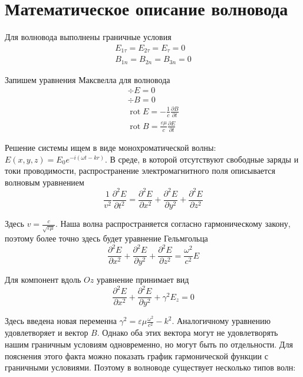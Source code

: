 \documentclass[a4paper, 14pt]{article}
\newcommand{\rot}{\mathop{\mathrm{rot}} \nolimits}
\begin{document}
    \section*{Математическое описание волновода} 
    
    Для волновода выполнены граничные условия
    \begin{gather*}
        E_{1\tau} = E_{2\tau} = E_\tau = 0 \\
        B_{1n} = B_{2n} = B_{3n} = 0
    \end{gather*}
    
    Запишем уравнения Максвелла для волновода
    \begin{gather*}
        \div E = 0 \\
        \div B = 0 \\
        \rot E = - \frac{1}{c} \frac{\partial B}{\partial t} \\
        \rot B = \frac{\varepsilon \mu}{c} \frac{\partial E}{\partial t}
    \end{gather*}
    
    Решение системы ищем в виде монохроматической волны: $E(x, y, z) = E_0 e^{-i(\omega t - kr)}$.
    В среде, в которой отсутствуют свободные заряды и токи проводимости, распространение электромагнитного поля
    описывается волновым уравнением
    \[ \frac{1}{v^2} \frac{\partial^2 E}{\partial t^2} = \frac{\partial^2 E}{\partial x^2} + \frac{\partial^2 E}
    {\partial y^2} + \frac{\partial^2 E}{\partial z^2} \]
    
    Здесь $v = \frac{c}{\sqrt{\varepsilon \mu}}$.
    Наша волна распространяется согласно гармоническому закону, поэтому более точно здесь будет уравнение Гельмгольца
    \[ \frac{\partial^2 E}{\partial x^2} + \frac{\partial^2 E}{\partial y^2} + \frac{\partial^2 E}{\partial z^2} =
    \frac{\omega^2}{c^2} E \]
    
    Для компонент вдоль $Oz$ уравнение принимает вид
    \[ \frac{\partial^2 E}{\partial x^2} + \frac{\partial^2 E}{\partial y^2} + \gamma^2 E_z = 0 \]
    
    Здесь введена новая переменна $\gamma^2 = \varepsilon \mu \frac{\omega^2}{c^2} - k^2$.
    Аналогичному уравнению удовлетворяет и вектор $B$.
    Однако оба этих вектора могут не удовлетворять нашим граничным условиям одновременно, но могут быть по отдельности.
    Для пояснения этого факта можно показать график гармонической функции с граничными условиями.
    Поэтому в волноводе существует несколько типов волн:
    
\end{document}
